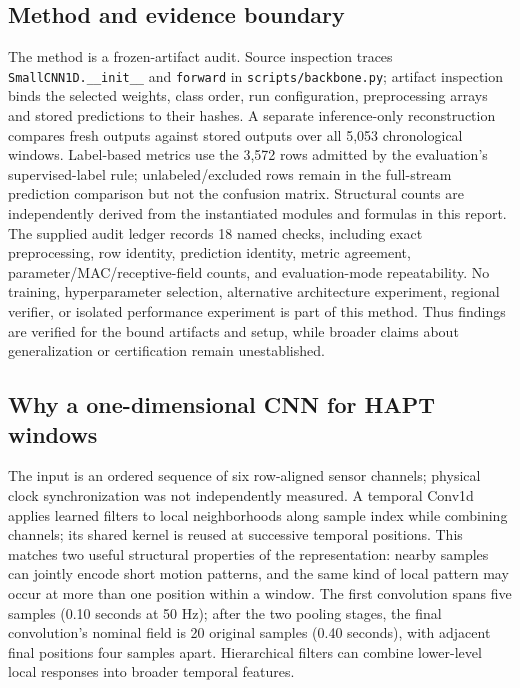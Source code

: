 \documentclass[11pt,a4paper]{article}
\newcommand{\code}[1]{{\small\ttfamily\nolinkurl{#1}}}
\begin{document}
\subsection{Method and evidence boundary}
The method is a frozen-artifact audit. Source inspection traces \code{SmallCNN1D.__init__} and \code{forward} in \code{scripts/backbone.py}; artifact inspection binds the selected weights, class order, run configuration, preprocessing arrays and stored predictions to their hashes. A separate inference-only reconstruction compares fresh outputs against stored outputs over all 5,053 chronological windows. Label-based metrics use the 3,572 rows admitted by the evaluation's supervised-label rule; unlabeled/excluded rows remain in the full-stream prediction comparison but not the confusion matrix. Structural counts are independently derived from the instantiated modules and formulas in this report. The supplied audit ledger records 18 named checks, including exact preprocessing, row identity, prediction identity, metric agreement, parameter/MAC/receptive-field counts, and evaluation-mode repeatability. No training, hyperparameter selection, alternative architecture experiment, regional verifier, or isolated performance experiment is part of this method. Thus findings are verified for the bound artifacts and setup, while broader claims about generalization or certification remain unestablished.

\subsection{Why a one-dimensional CNN for HAPT windows}
The input is an ordered sequence of six row-aligned sensor channels; physical clock synchronization was not independently measured. A temporal Conv1d applies learned filters to local neighborhoods along sample index while combining channels; its shared kernel is reused at successive temporal positions. This matches two useful structural properties of the representation: nearby samples can jointly encode short motion patterns, and the same kind of local pattern may occur at more than one position within a window. The first convolution spans five samples (0.10 seconds at 50 Hz); after the two pooling stages, the final convolution's nominal field is 20 original samples (0.40 seconds), with adjacent final positions four samples apart. Hierarchical filters can combine lower-level local responses into broader temporal features.
\end{document}
